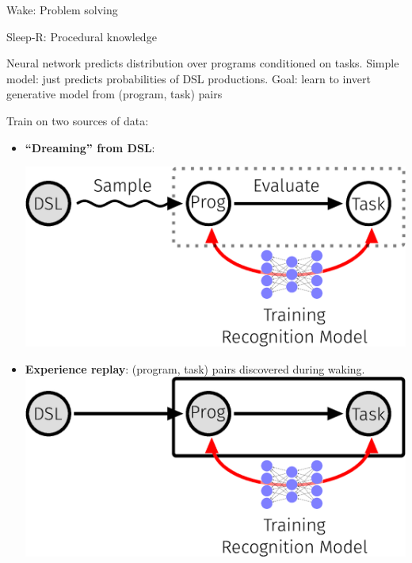 \documentclass[final]{beamer}
\newlength{\onecolwid}
\begin{document}
\begin{frame}[t]
\begin{columns}[t]
\begin{column}{\onecolwid}
\begin{block}{Wake: Problem solving}

  

\end{block}



\begin{block}{Sleep-R: Procedural knowledge}

  Neural network
  predicts distribution over programs conditioned on tasks.
  Simple model: just predicts probabilities of DSL productions.  Goal: learn to invert generative model from (program, task) pairs  


Train on two sources of data:

  \begin{itemize}
  \item \textbf{``Dreaming'' from DSL}:

    \includegraphics[width = 20cm]{figures/animation/Sleep-R-2.eps}
  \item \textbf{Experience replay}: (program, task) pairs discovered during waking.
  \includegraphics[width = 20cm]{figures/animation/Sleep-R-1.eps}    
  \end{itemize}
  


\end{block}
\end{column}
\end{columns}
\end{frame}
\end{document}
